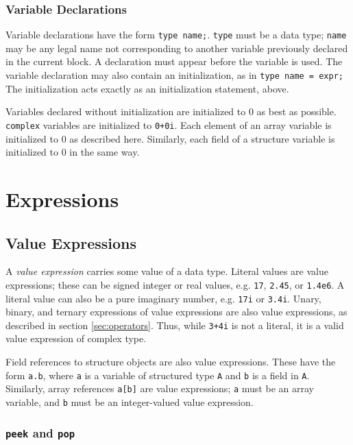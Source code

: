 \documentclass[11pt]{article}
\begin{document}
\subsubsection{Variable Declarations}

Variable declarations have the form \lstinline|type name;|.  \lstinline|type|
must be a data type; \lstinline|name| may be any legal name not
corresponding to another variable previously declared in the current
block.  A declaration must appear before the variable is used.  The
variable declaration may also contain an initialization, as in
\lstinline|type name = expr;|  The initialization acts exactly as an
initialization statement, above.

Variables declared without initialization are initialized to 0 as best
as possible.  \lstinline|complex| variables are initialized to
\lstinline|0+0i|.  Each element of an array variable is initialized to
0 as described here.  Similarly, each field of a structure variable is
initialized to 0 in the same way.


\section{Expressions}

\subsection{Value Expressions}
\label{sec:expr-value}

A \emph{value expression} carries some value of a data type.  Literal
values are value expressions; these can be signed integer or real
values, e.g. \lstinline|17|, \lstinline|2.45|, or \lstinline|1.4e6|.  A literal value
can also be a pure imaginary number, e.g. \lstinline|17i| or \lstinline|3.4i|.
Unary, binary, and ternary expressions of value expressions are also
value expressions, as described in section \ref{sec:operators}.  Thus,
while \lstinline|3+4i| is not a literal, it is a valid value expression of
complex type.

Field references to structure objects are also value expressions.
These have the form \lstinline|a.b|, where \lstinline|a| is a variable of
structured type \lstinline|A| and \lstinline|b| is a field in \lstinline|A|.
Similarly, array references \lstinline|a[b]| are value expressions;
\lstinline|a| must be an array variable, and \lstinline|b| must be an
integer-valued value expression.

\subsubsection{\lstinline|peek| and \lstinline|pop|}
\label{sec:expr-peek-pop}
\end{document}
